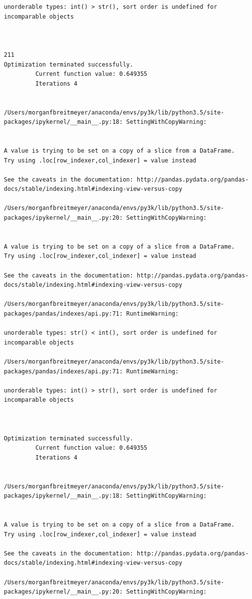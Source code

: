 \begin{lstlisting}
unorderable types: int() > str(), sort order is undefined for incomparable objects



211
Optimization terminated successfully.
         Current function value: 0.649355
         Iterations 4


/Users/morganfbreitmeyer/anaconda/envs/py3k/lib/python3.5/site-packages/ipykernel/__main__.py:18: SettingWithCopyWarning:


A value is trying to be set on a copy of a slice from a DataFrame.
Try using .loc[row_indexer,col_indexer] = value instead

See the caveats in the documentation: http://pandas.pydata.org/pandas-docs/stable/indexing.html#indexing-view-versus-copy

/Users/morganfbreitmeyer/anaconda/envs/py3k/lib/python3.5/site-packages/ipykernel/__main__.py:20: SettingWithCopyWarning:


A value is trying to be set on a copy of a slice from a DataFrame.
Try using .loc[row_indexer,col_indexer] = value instead

See the caveats in the documentation: http://pandas.pydata.org/pandas-docs/stable/indexing.html#indexing-view-versus-copy

/Users/morganfbreitmeyer/anaconda/envs/py3k/lib/python3.5/site-packages/pandas/indexes/api.py:71: RuntimeWarning:

unorderable types: str() < int(), sort order is undefined for incomparable objects

/Users/morganfbreitmeyer/anaconda/envs/py3k/lib/python3.5/site-packages/pandas/indexes/api.py:71: RuntimeWarning:

unorderable types: int() > str(), sort order is undefined for incomparable objects



Optimization terminated successfully.
         Current function value: 0.649355
         Iterations 4


/Users/morganfbreitmeyer/anaconda/envs/py3k/lib/python3.5/site-packages/ipykernel/__main__.py:18: SettingWithCopyWarning:


A value is trying to be set on a copy of a slice from a DataFrame.
Try using .loc[row_indexer,col_indexer] = value instead

See the caveats in the documentation: http://pandas.pydata.org/pandas-docs/stable/indexing.html#indexing-view-versus-copy

/Users/morganfbreitmeyer/anaconda/envs/py3k/lib/python3.5/site-packages/ipykernel/__main__.py:20: SettingWithCopyWarning:



\end{lstlisting}
